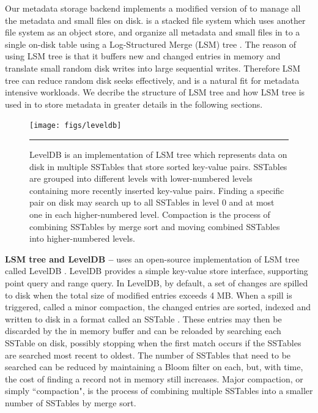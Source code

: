 Our metadata storage backend implements a modified version of \tfs
to manage all the metadata and small files on disk.
\tfs \cite{TableFS} is a stacked file system which uses another file system
as an object store, and organize all metadata and small files in to a single
on-disk table using a Log-Structured Merge (LSM) tree \cite{ONeil1996}.
The reason of using LSM tree is that it buffers new and changed entries in
memory and translate small random disk writes into large sequential writes.
Therefore LSM tree can reduce random disk seeks effectively, and is a natural
fit for metadata intensive workloads. We decribe the structure of LSM tree
and how LSM tree is used in \tfs to store metadata in greater details
in the following sections.

\begin{figure}[t]
\texttt{[image: figs/leveldb]}
\caption{
LevelDB is an implementation of LSM tree which represents data on disk
in multiple SSTables that store sorted key-value pairs.
SSTables are grouped into different levels with lower-numbered levels
containing more recently inserted key-value pairs.
Finding a specific pair on disk may search up to all SSTables in level 0
and at most one in each higher-numbered level.
Compaction is the process of combining SSTables
by merge sort and moving combined SSTables into higher-numbered levels.
}
\vspace{10pt}
\hrule
\label{fig:leveldb}
\end{figure}


\textbf{LSM tree and LevelDB --}
\tfs uses an open-source implementation of LSM tree called LevelDB
\cite{LevelDB}. LevelDB provides a simple key-value store interface,
supporting point query and range query. In LevelDB, by default,
a set of changes are spilled to disk when the total size of modified
entries exceeds 4 MB.  When a spill is triggered, called a
minor compaction, the changed entries are sorted, indexed and written to disk
in a format called an SSTable \cite{BigTable}.  These entries may then be
discarded by the in memory buffer and can be reloaded by searching each SSTable
on disk, possibly stopping when the first match occurs if the SSTables are
searched most recent to oldest.  The number of SSTables that need to be
searched can be reduced by maintaining a Bloom filter\cite{bloomfilter} on each,
but, with time, the cost of finding a record not in memory still increases.
Major compaction, or simply ``compaction",
is the process of combining multiple SSTables
into a smaller number of SSTables by merge sort.

